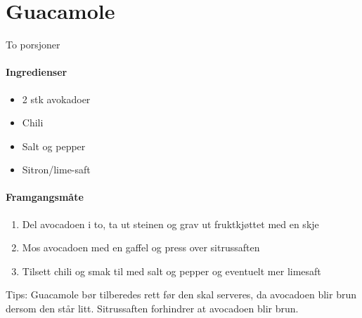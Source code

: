 \section{﻿Guacamole}
\label{guacamole}
To porsjoner

\paragraph{Ingredienser}
\begin{itemize}[noitemsep]
	\item 2 stk avokadoer
	\item Chili
	\item Salt og pepper
	\item Sitron/lime-saft
\end{itemize}


\paragraph{Framgangsmåte}
\begin{enumerate}[noitemsep]
	\item Del avocadoen i to, ta ut steinen og grav ut fruktkjøttet med en skje
	\item Mos avocadoen med en gaffel og press over sitrussaften
	\item Tilsett chili og smak til med salt og pepper og eventuelt mer limesaft
\end{enumerate}


Tips: Guacamole bør tilberedes rett før den skal serveres, da avocadoen blir brun dersom den står litt. Sitrussaften forhindrer at avocadoen blir brun.
